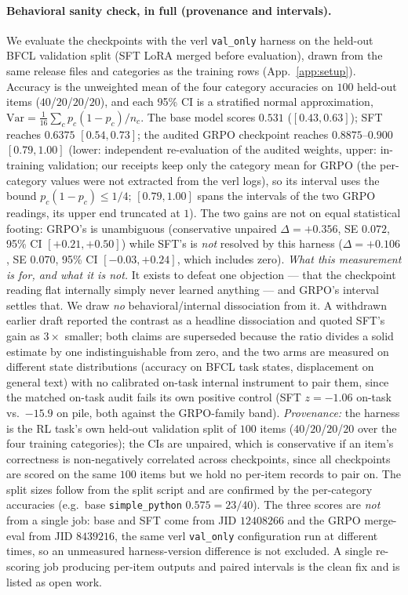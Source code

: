 \documentclass{article}
\begin{document}
\paragraph{Behavioral sanity check, in full (provenance and intervals).} We evaluate the checkpoints with the verl \texttt{val\_only} harness on the held-out BFCL validation split (SFT LoRA merged before evaluation), drawn from the same release files and categories as the training rows (App.~\ref{app:setup}). Accuracy is the unweighted mean of the four category accuracies on $100$ held-out items ($40$/$20$/$20$/$20$), and each 95\% CI is a stratified normal approximation, $\mathrm{Var}=\frac1{16}\sum_c p_c(1-p_c)/n_c$. The base model scores $0.531$ ($[0.43,0.63]$); SFT reaches $0.6375$ $[0.54,0.73]$; the audited GRPO checkpoint reaches $0.8875$--$0.900$ $[0.79,1.00]$ (lower: independent re-evaluation of the audited weights, upper: in-training validation; our receipts keep only the category mean for GRPO (the per-category values were not extracted from the verl logs), so its interval uses the bound $p_c(1-p_c)\le1/4$; $[0.79,1.00]$ spans the intervals of the two GRPO readings, its upper end truncated at $1$). The two gains are not on equal statistical footing: GRPO's is unambiguous (conservative unpaired $\Delta=+0.356$, SE $0.072$, 95\% CI $[+0.21,+0.50]$) while SFT's is \emph{not} resolved by this harness ($\Delta=+0.106$, SE $0.070$, 95\% CI $[-0.03,+0.24]$, which includes zero). \emph{What this measurement is for, and what it is not.} It exists to defeat one objection --- that the checkpoint reading flat internally simply never learned anything --- and GRPO's interval settles that. We draw \emph{no} behavioral/internal dissociation from it. A withdrawn earlier draft reported the contrast as a headline dissociation and quoted SFT's gain as $3\times$ smaller; both claims are superseded because the ratio divides a solid estimate by one indistinguishable from zero, and the two arms are measured on different state distributions (accuracy on BFCL task states, displacement on general text) with no calibrated on-task internal instrument to pair them, since the matched on-task audit fails its own positive control (SFT $z=-1.06$ on-task vs.\ $-15.9$ on pile, both against the GRPO-family band). \emph{Provenance:} the harness is the RL task's own held-out validation split of $100$ items ($40$/$20$/$20$/$20$ over the four training categories); the CIs are unpaired, which is conservative if an item's correctness is non-negatively correlated across checkpoints, since all checkpoints are scored on the same $100$ items but we hold no per-item records to pair on. The split sizes follow from the split script and are confirmed by the per-category accuracies (e.g.\ base \texttt{simple\_python} $0.575=23/40$). The three scores are \emph{not} from a single job: base and SFT come from JID $12408266$ and the GRPO merge-eval from JID $8439216$, the same verl \texttt{val\_only} configuration run at different times, so an unmeasured harness-version difference is not excluded. A single re-scoring job producing per-item outputs and paired intervals is the clean fix and is listed as open work.
\end{document}
